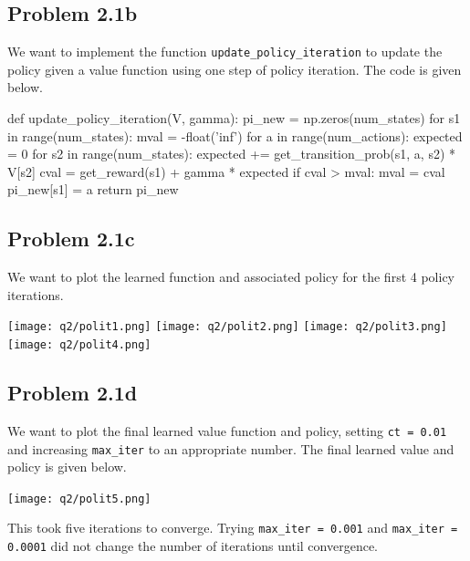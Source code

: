 \documentclass[submit]{harvardml}
\begin{document}
\subsection*{Problem 2.1b}
We want to implement the function \texttt{update\_policy\_iteration} to update the policy given a value function using one step of policy iteration. The code is given below.
\begin{python}
def update_policy_iteration(V, gamma):
    pi_new = np.zeros(num_states)
    for s1 in range(num_states):
        mval = -float('inf')
        for a in range(num_actions):
            expected = 0 
            for s2 in range(num_states):
                expected += get_transition_prob(s1, a, s2) * V[s2]
            cval = get_reward(s1) + gamma * expected
            if cval > mval:
                mval = cval
                pi_new[s1] = a
    return pi_new
\end{python}

\newpage
\subsection*{Problem 2.1c}
We want to plot the learned function and associated policy for the first 4 policy iterations.

\texttt{[image: q2/polit1.png]}
\texttt{[image: q2/polit2.png]}
\texttt{[image: q2/polit3.png]}
\texttt{[image: q2/polit4.png]}

\newpage
\subsection*{Problem 2.1d}
We want to plot the final learned value function and policy, setting \texttt{ct = 0.01} and increasing \texttt{max\_iter} to an appropriate number. The final learned value and policy is given below.

\texttt{[image: q2/polit5.png]}

This took five iterations to converge. Trying \texttt{max\_iter = 0.001} and \texttt{max\_iter = 0.0001} did not change the number of iterations until convergence.
\end{document}
